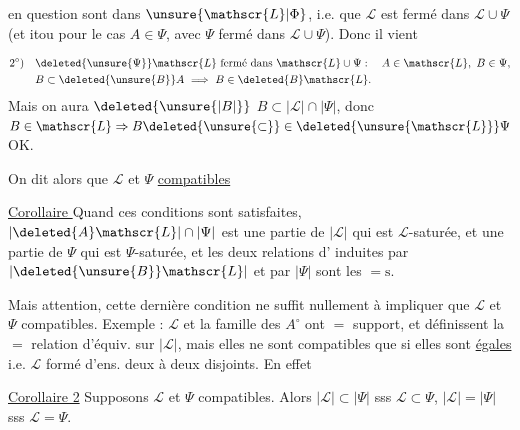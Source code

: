 en question sont dans $\unsure{\mathscr{L}|\Phi}$, i.e. que $\mathscr{L}$ est fermé dans $\mathscr{L}\cup\Psi$ (et itou pour le cas $A\in\Psi$, avec $\Psi$ fermé dans $\mathscr{L}\cup\Psi$). Donc il vient

\[
\begin{aligned}
2^{\circ})\quad &\deleted{\unsure{\Psi}}\mathscr{L}\ \text{fermé dans }\mathscr{L}\cup\Psi:\quad A\in\mathscr{L},\ B\in\Psi,\\
&B\subset\deleted{\unsure{B}}A\ \Longrightarrow\ B\in\deleted{B}\mathscr{L}.
\end{aligned}
\]
Mais on aura $\deleted{\unsure{\lvert B\rvert}}$ $B\subset\lvert\mathscr{L}\rvert\cap\lvert\Psi\rvert$, donc $B\in\mathscr{L}\Rightarrow B\deleted{\unsure{\subset}}\in\deleted{\unsure{\mathscr{L}}}\Psi$ OK.

\uline{} On dit alors que $\mathscr{L}$ et $\Psi$ \uline{compatibles}

\uline{Corollaire } Quand ces conditions sont satisfaites, $\lvert\deleted{A}\mathscr{L}\rvert\cap\lvert\Psi\rvert$ est une partie de $\lvert\mathscr{L}\rvert$ qui est $\mathscr{L}$-saturée, et une partie de $\Psi$ qui est $\Psi$-saturée, et les deux relations d' induites par $\lvert\deleted{\unsure{B}}\mathscr{L}\rvert$ et par $\lvert\Psi\rvert$ sont les $=\mathrm{s}$.

Mais attention, cette dernière condition ne suffit nullement à impliquer que $\mathscr{L}$ et $\Psi$ compatibles. Exemple : $\mathscr{L}$ et la famille  des $A^{\circ}$ ont $=$ support, et définissent la $=$ relation d'équiv. sur $\lvert\mathscr{L}\rvert$, mais elles ne sont compatibles que si elles sont \uline{égales}  i.e. $\mathscr{L}$ formé d'ens. deux à deux disjoints. En effet 

\uline{Corollaire 2} Supposons $\mathscr{L}$ et $\Psi$ compatibles. Alors $\lvert\mathscr{L}\rvert\subset\lvert\Psi\rvert$ sss $\mathscr{L}\subset\Psi$, $\lvert\mathscr{L}\rvert=\lvert\Psi\rvert$ sss $\mathscr{L}=\Psi$.
